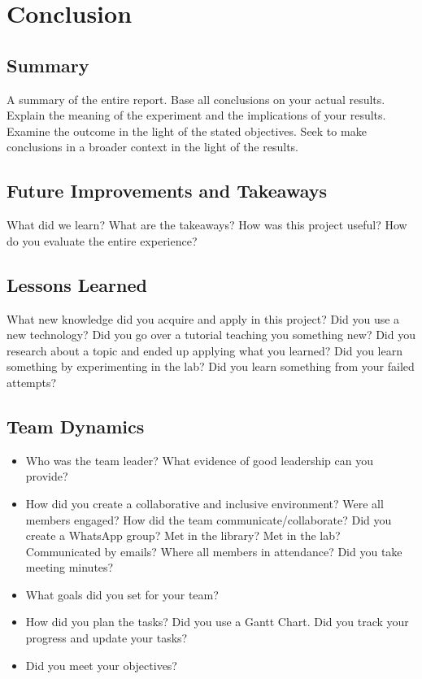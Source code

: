 \section{Conclusion}
\subsection{Summary}
A summary of the entire report. Base all conclusions on your actual results. Explain the meaning of the experiment and the implications of your results. Examine the outcome in the light of the stated objectives. Seek to make conclusions in a broader context in the light of the results.

\subsection{Future Improvements and Takeaways}
What did we learn? What are the takeaways? How was this project useful? How do you evaluate the entire experience? 

\subsection{Lessons Learned}
What new knowledge did you acquire and apply in this project? Did you use a new technology? Did you go over a tutorial teaching you something new? Did you research about a topic and ended up applying what you learned? Did you learn something by experimenting in the lab? Did you learn something from your failed attempts? 

\subsection{Team Dynamics}
\begin{itemize}

\item Who was the team leader? What evidence of good leadership can you provide? 
\item	How did you create a collaborative and inclusive environment? Were all members engaged? How did the team communicate/collaborate? Did you create a WhatsApp group? Met in the library? Met in the lab? Communicated by emails? Where all members in attendance? Did you take meeting minutes?
\item What goals did you set for your team? 
\item	How did you plan the tasks? Did you use a Gantt Chart. Did you track  your progress and update your tasks?  
\item	Did you meet your objectives? 

\end{itemize}

